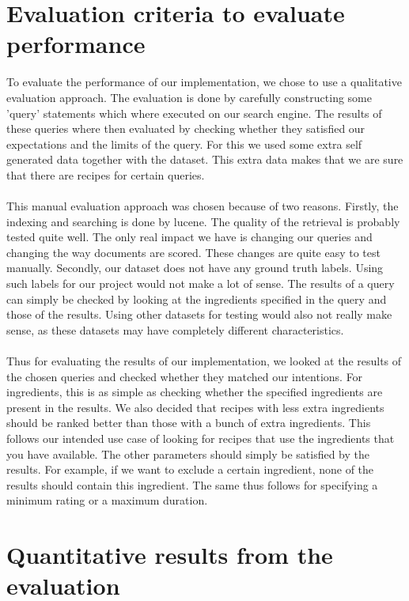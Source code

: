 \documentclass{article}
\begin{document}
\section{Evaluation criteria to evaluate performance}

To evaluate the performance of our implementation,
we chose to use a qualitative evaluation approach.
The evaluation is done by carefully constructing some 'query' statements
which where executed on our search engine.
The results of these queries where then evaluated by checking whether they
satisfied our expectations and the limits of the query.
For this we used some extra self generated data together with the dataset.
This extra data makes that we are sure that there are recipes for certain queries.
\\~\\
This manual evaluation approach was chosen because of two reasons.
Firstly, the indexing and searching is done by lucene.
The quality of the retrieval is probably tested quite well.
The only real impact we have is changing our queries and changing the way
documents are scored.
These changes are quite easy to test manually.
Secondly, our dataset does not have any ground truth labels.
Using such labels for our project would not make a lot of sense.
The results of a query can simply be checked by looking at the ingredients
specified in the query and those of the results.
Using other datasets for testing would also not really make sense,
as these datasets may have completely different characteristics.
\\~\\
Thus for evaluating the results of our implementation,
we looked at the results of the chosen queries and checked whether they
matched our intentions.
For ingredients, this is as simple as checking whether the specified
ingredients are present in the results.
We also decided that recipes with less extra ingredients should be ranked
better than those with a bunch of extra ingredients.
This follows our intended use case of looking for recipes that use the
ingredients that you have available.
The other parameters should simply be satisfied by the results.
For example, if we want to exclude a certain ingredient,
none of the results should contain this ingredient.
The same thus follows for specifying a minimum rating or a maximum duration.

\section{Quantitative results from the evaluation}
\end{document}
